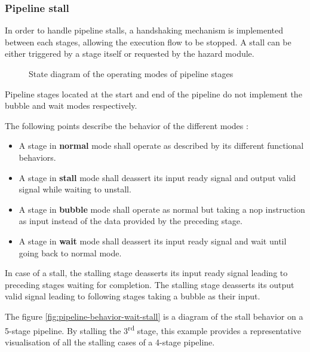     \subsubsection{Pipeline stall}

      \label{pipeline-stall}

      \begin{content}
          In order to handle pipeline stalls, a handshaking mechanism is implemented between each stages, allowing the execution flow to be stopped. A stall can be either triggered by a stage itself or requested by the hazard module.
        \end{content}

      \begin{figure}[H]
          \centering
          
          \caption{State diagram of the operating modes of pipeline stages}
          \label{fig:pipeline-stage-state}
        \end{figure}

      \begin{content}
          Pipeline stages located at the start and end of the pipeline do not implement the bubble and wait modes respectively.
          
          The following points describe the behavior of the different modes :
          \begin{itemize}
              \item A stage in \textbf{normal} mode shall operate as described by its different functional behaviors.
              \item A stage in \textbf{stall} mode shall deassert its input ready signal and output valid signal while waiting to unstall.
              \item A stage in \textbf{bubble} mode shall operate as normal but taking a nop instruction as input instead of the data provided by the preceding stage.
              \item A stage in \textbf{wait} mode shall deassert its input ready signal and wait until going back to normal mode.
            \end{itemize}
          
          In case of a stall, the stalling stage deasserts its input ready signal leading to preceding stages waiting for completion. The stalling stage deasserts its output valid signal leading to following stages taking a bubble as their input.

          The figure \ref{fig:pipeline-behavior-wait-stall} is a diagram of the stall behavior on a 5-stage pipeline. By stalling the 3\textsuperscript{rd} stage, this example provides a representative visualisation of all the stalling cases of a 4-stage pipeline.
        \end{content}

